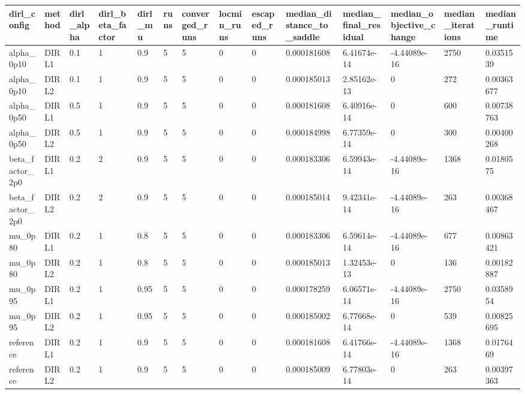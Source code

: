 \begin{tabular}{llllllllllllll}
\toprule
dirl\_config & method & dirl\_alpha & dirl\_beta\_factor & dirl\_mu & runs & converged\_runs & locmin\_runs & escaped\_runs & median\_distance\_to\_saddle & median\_final\_residual & median\_objective\_change & median\_iterations & median\_runtime \\
\midrule
alpha\_0p10 & DIRL1 & 0.1 & 1 & 0.9 & 5 & 5 & 0 & 0 & 0.000181608 & 6.41674e-14 & -4.44089e-16 & 2750 & 0.0351539 \\
alpha\_0p10 & DIRL2 & 0.1 & 1 & 0.9 & 5 & 5 & 0 & 0 & 0.000185013 & 2.85162e-13 & 0 & 272 & 0.00363677 \\
alpha\_0p50 & DIRL1 & 0.5 & 1 & 0.9 & 5 & 5 & 0 & 0 & 0.000181608 & 6.40916e-14 & 0 & 600 & 0.00738763 \\
alpha\_0p50 & DIRL2 & 0.5 & 1 & 0.9 & 5 & 5 & 0 & 0 & 0.000184998 & 6.77359e-14 & 0 & 300 & 0.00400268 \\
beta\_factor\_2p0 & DIRL1 & 0.2 & 2 & 0.9 & 5 & 5 & 0 & 0 & 0.000183306 & 6.59943e-14 & -4.44089e-16 & 1368 & 0.0180575 \\
beta\_factor\_2p0 & DIRL2 & 0.2 & 2 & 0.9 & 5 & 5 & 0 & 0 & 0.000185014 & 9.42341e-14 & -4.44089e-16 & 263 & 0.00368467 \\
mu\_0p80 & DIRL1 & 0.2 & 1 & 0.8 & 5 & 5 & 0 & 0 & 0.000183306 & 6.59614e-14 & -4.44089e-16 & 677 & 0.00863421 \\
mu\_0p80 & DIRL2 & 0.2 & 1 & 0.8 & 5 & 5 & 0 & 0 & 0.000185013 & 1.32453e-13 & 0 & 136 & 0.00182887 \\
mu\_0p95 & DIRL1 & 0.2 & 1 & 0.95 & 5 & 5 & 0 & 0 & 0.000178259 & 6.06571e-14 & -4.44089e-16 & 2750 & 0.0358954 \\
mu\_0p95 & DIRL2 & 0.2 & 1 & 0.95 & 5 & 5 & 0 & 0 & 0.000185002 & 6.77668e-14 & 0 & 539 & 0.00825695 \\
reference & DIRL1 & 0.2 & 1 & 0.9 & 5 & 5 & 0 & 0 & 0.000181608 & 6.41766e-14 & -4.44089e-16 & 1368 & 0.0176469 \\
reference & DIRL2 & 0.2 & 1 & 0.9 & 5 & 5 & 0 & 0 & 0.000185009 & 6.77803e-14 & 0 & 263 & 0.00397363 \\
\bottomrule
\end{tabular}
